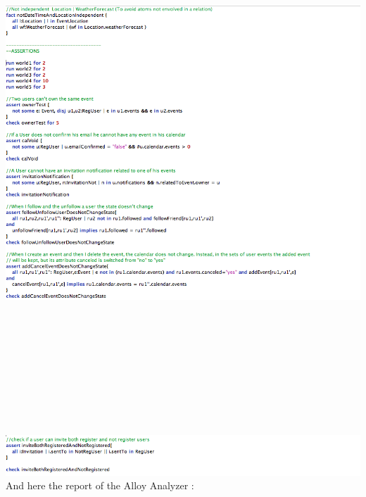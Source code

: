 \documentclass[12pt]{book}
\begin{document}
\includegraphics[width=19cm,height=21cm]{Alloy10}\\
\newpage
\includegraphics[scale=0.8]{Alloy11}\\

And here the report of the Alloy Analyzer : \\
\end{document}
